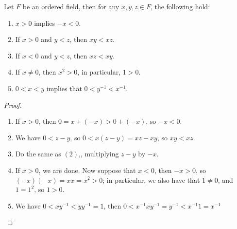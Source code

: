 \begin{proposition}\label{1.2.4}
    Let $F$ be an ordered field, then for any  $x,y,z \in F$, the following hold: 
         \begin{enumerate}[label=(\arabic*)]
             \item $x>0$ implies $-x<0$.

             \item If $x>0$  and $y<z$, then $xy<xz$.

             \item If $x<0$  and $y<z$, then $xz<xy$.

             \item If $x \neq 0$, then $x^2>0$, in particular, $1>0$.

             \item $0<x<y$ implies that $0<y^{-1}<x^{-1}$.
        \end{enumerate}
\end{proposition}
\begin{proof}
    \begin{enumerate}[label=(\arabic*)]
        \item If $x>0$, then  $0=x+(-x)>0+(-x)$, so  $-x<0$.

        \item We have $0<z-y$, so  $0<x(z-y)=xz-xy$, so $xy<xz$.

        \item Do the same as  $(2)$,, multiplying  $z-y$ by  $-x$.

        \item If  $x>0$, we are done. Now suppose that  $x<0$, then  $-x>0$, so 
            $(-x)(-x)=xx=x^2>0$; in particular, we also have that  $1 \neq 0$, and 
             $1=1^2$, so  $1>0$.

         \item We have  $0<xy^{-1}<yy^{-1}=1$, then  $0<x^{-1}xy^{-1}=y^{-1}<x^{-1}1=x^{-1}$
    \end{enumerate}		
\end{proof}

